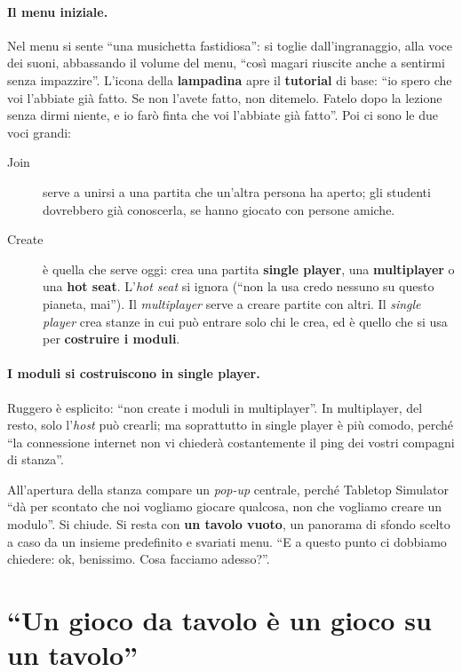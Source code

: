 \paragraph{Il menu iniziale.} Nel menu si sente ``una musichetta fastidiosa'': si
toglie dall'ingranaggio, alla voce dei suoni, abbassando il volume del menu, ``così
magari riuscite anche a sentirmi senza impazzire''. L'icona della \textbf{lampadina}
apre il \textbf{tutorial} di base: ``io spero che voi l'abbiate già fatto. Se non
l'avete fatto, non ditemelo. Fatelo dopo la lezione senza dirmi niente, e io farò finta
che voi l'abbiate già fatto''. Poi ci sono le due voci grandi:
\begin{description}
  \item[Join] serve a unirsi a una partita che un'altra persona ha aperto; gli
        studenti dovrebbero già conoscerla, se hanno giocato con persone amiche.
  \item[Create] è quella che serve oggi: crea una partita \textbf{single player}, una
        \textbf{multiplayer} o una \textbf{hot seat}. L'\emph{hot seat} si ignora
        (``non la usa credo nessuno su questo pianeta, mai''). Il
        \emph{multiplayer} serve a creare partite con altri. Il \emph{single
        player} crea stanze in cui può entrare solo chi le crea, ed è quello che si
        usa per \textbf{costruire i moduli}.
\end{description}

\paragraph{I moduli si costruiscono in single player.} Ruggero è esplicito: ``non
create i moduli in multiplayer''. In multiplayer, del resto, solo l'\emph{host} può
crearli; ma soprattutto in single player è più comodo, perché ``la connessione
internet non vi chiederà costantemente il ping dei vostri compagni di stanza''.

All'apertura della stanza compare un \emph{pop-up} centrale, perché Tabletop
Simulator ``dà per scontato che noi vogliamo giocare qualcosa, non che vogliamo
creare un modulo''. Si chiude. Si resta con \textbf{un tavolo vuoto}, un panorama di
sfondo scelto a caso da un insieme predefinito e svariati menu. ``E a questo punto ci
dobbiamo chiedere: ok, benissimo. Cosa facciamo adesso?''.

\section{``Un gioco da tavolo è un gioco su un tavolo''}
\label{a8:sec:simulatore}

